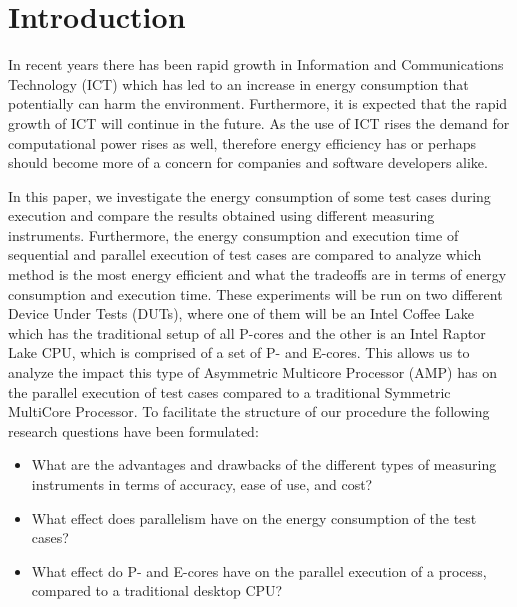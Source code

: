 \section{Introduction}

In recent years there has been rapid growth in Information and Communications Technology (ICT) which has led to an increase in energy consumption that potentially can harm the environment. Furthermore, it is expected that the rapid growth of ICT will continue in the future. \cite{jones2018stop,andrae2015global} As the use of ICT rises the demand for computational power rises as well, therefore energy efficiency has or perhaps should become more of a concern for companies and software developers alike.

In this paper, we investigate the energy consumption of some test cases during execution and compare the results obtained using different measuring instruments. Furthermore, the energy consumption and execution time of sequential and parallel execution of test cases are compared to analyze which method is the most energy efficient and what the tradeoffs are in terms of energy consumption and execution time. These experiments will be run on two different Device Under Tests (DUTs), where one of them will be an Intel Coffee Lake which has the traditional setup of all P-cores and the other is an Intel Raptor Lake CPU, which is comprised of a set of P- and E-cores. This allows us to analyze the impact this type of Asymmetric Multicore Processor (AMP) has on the parallel execution of test cases compared to a traditional Symmetric MultiCore Processor. To facilitate the structure of our procedure the following research questions have been formulated:

\begin{itemize}
    \item What are the advantages and drawbacks of the different types of measuring instruments in terms of accuracy, ease of use, and cost?
    \item What effect does parallelism have on the energy consumption of the test cases?
    \item What effect do P- and E-cores have on the parallel execution of a process, compared to a traditional desktop CPU?
\end{itemize}

